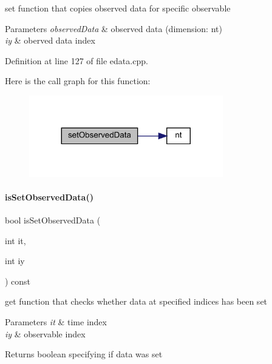 set function that copies observed data for specific observable


\begin{DoxyParams}{Parameters}
{\em observed\+Data} & observed data (dimension\+: nt) \\
\hline
{\em iy} & oberved data index \\
\hline
\end{DoxyParams}


Definition at line 127 of file edata.\+cpp.

Here is the call graph for this function\+:
\nopagebreak
\begin{figure}[H]
\begin{center}
\leavevmode
\includegraphics[width=239pt]{classamici_1_1_exp_data_a814827d61da6c675276758c856faf794_cgraph}
\end{center}
\end{figure}
\mbox{\label{classamici_1_1_exp_data_aedcda756b6356d6e147f2f4eb7658500}} 
\paragraph{\texorpdfstring{is\+Set\+Observed\+Data()}{isSetObservedData()}}
{\footnotesize\ttfamily bool is\+Set\+Observed\+Data (\begin{DoxyParamCaption}\item[{int}]{it,  }\item[{int}]{iy }\end{DoxyParamCaption}) const}

get function that checks whether data at specified indices has been set


\begin{DoxyParams}{Parameters}
{\em it} & time index \\
\hline
{\em iy} & observable index \\
\hline
\end{DoxyParams}
\begin{DoxyReturn}{Returns}
boolean specifying if data was set 
\end{DoxyReturn}


